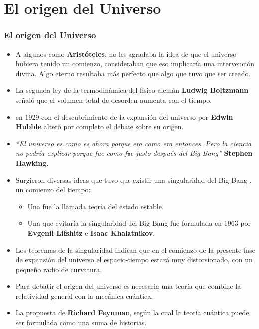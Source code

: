 \documentclass{beamer}
\begin{document}
\section[Origen del Universo]{El origen del Universo}
\begin{frame}
 \frametitle{El origen del Universo}
 \begin{itemize}
  \item A algunos como \textbf{Aristóteles}, no les agradaba la idea de que el universo hubiera tenido un comienzo, consideraban que eso implicaría una intervención divina. Algo eterno resultaba más perfecto que algo que tuvo que ser creado.
  \item La segunda ley de la termodinámica del físico alemán \textbf{Ludwig Boltzmann} señaló que el volumen total de desorden aumenta con el tiempo.
  \item en 1929 con el descubrimiento de la expansión del universo por \textbf{Edwin Hubble} alteró por completo el debate sobre su origen.
  \item \textit{``El universo es como es ahora porque era como era entonces. Pero la ciencia no podría explicar porque fue como fue justo después del Big Bang''} \textbf{Stephen Hawking}.
 \end{itemize}
\end{frame}
\begin{frame}
 \begin{itemize}
  \item Surgieron diversas ideas que tuvo que existir una singularidad del Big Bang , un comienzo del tiempo:
    \begin{itemize}
      \item Una fue la llamada teoría del estado estable.
      \item Una que evitaría la singularidad del Big Bang fue formulada en 1963 por \textbf{Evgenii Lifshitz} e \textbf{Isaac Khalatnikov}.
    \end{itemize}
  \item Los teoremas de la singularidad indican que en el comienzo de la presente fase de expansión del universo el espacio-tiempo estará muy distorsionado, con un pequeño radio de curvatura.
  \item Para debatir el origen del universo es necesaria una teoría que combine la relatividad general con la mecánica cuántica.
  \item La propuesta de \textbf{Richard Feynman}, según la cual la teoría cuántica puede ser formulada como una suma de historias.
 \end{itemize}
\end{frame}
\end{document}
